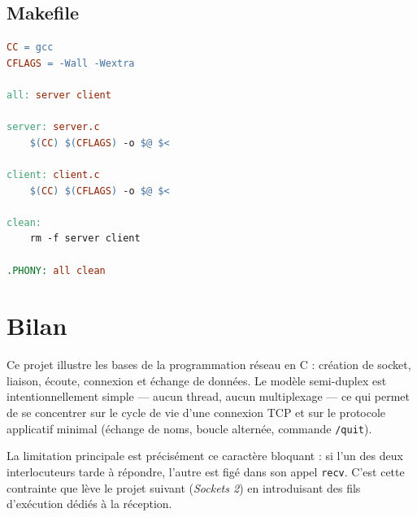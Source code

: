 \documentclass[12pt,a4paper]{article}
\begin{document}
\subsection{Makefile}

\begin{lstlisting}[language=make, caption={Makefile --- compilation des deux binaires}]
CC = gcc
CFLAGS = -Wall -Wextra

all: server client

server: server.c
	$(CC) $(CFLAGS) -o $@ $<

client: client.c
	$(CC) $(CFLAGS) -o $@ $<

clean:
	rm -f server client

.PHONY: all clean
\end{lstlisting}

\section{Bilan}

Ce projet illustre les bases de la programmation réseau en C : création de
socket, liaison, écoute, connexion et échange de données. Le modèle
semi-duplex est intentionnellement simple --- aucun thread, aucun
multiplexage --- ce qui permet de se concentrer sur le cycle de vie d'une
connexion TCP et sur le protocole applicatif minimal (échange de noms,
boucle alternée, commande \texttt{/quit}).

La limitation principale est précisément ce caractère bloquant : si l'un
des deux interlocuteurs tarde à répondre, l'autre est figé dans son appel
\texttt{recv}. C'est cette contrainte que lève le projet suivant
(\emph{Sockets 2}) en introduisant des fils d'exécution dédiés à la
réception.
\end{document}
